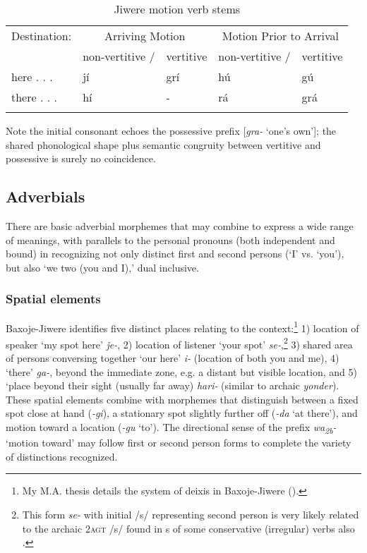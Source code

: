\documentclass[output=paper]{LSP/langsci}
\begin{document}
\begin{table} 
\begin{tabular}{ l l l l l }
\lsptoprule
 Destination: & \multicolumn{2}{c}{Arriving Motion} & \multicolumn{2}{c}{Motion Prior to Arrival} \\
& non-vertitive / & vertitive & non-vertitive / & vertitive \\
\midrule
here . . . 	& jí  & grí & hú &  gú \\
there . . . 	& hí &   -  & rá & grá \\
\lspbottomrule
\end{tabular}
\caption{Jiwere motion verb stems \citep[293]{Taylor1976a}} \label{motionverb}
\end{table}
Note the initial consonant  echoes the possessive prefix [\textit{gra-} `one's own']; the shared phonological shape plus semantic congruity between vertitive and possessive is surely no coincidence.  

\subsection{Adverbials}
There are basic adverbial morphemes that may combine to express a wide range of meanings, with parallels to the personal pronouns (both independent and bound) in recognizing not only distinct first and second persons (`I' vs. `you'), but also `we two (you and I),' dual inclusive.  

\subsubsection{Spatial elements}   

Baxoje-Jiwere identifies five distinct places relating to the  context:\footnote{My M.A. thesis details the system of deixis in Baxoje-Jiwere (\citealt{Hopkins1988}).} 1) location of speaker `my spot here' \textit{\v{j}e-},  2) location of  listener `your spot' \textit{se-},\footnote{This form \textit{se-} with initial /s/ representing second person is very likely related to the archaic \textsc{2agt} /s/ found in s of some conservative (irregular) verbs also \citep[480]{Rankin2005b}.}  3) shared area of persons conversing together `our here' \textit{i-} (location of both you and me),  4) `there' \textit{ga-}, beyond the immediate  zone, e.g. a distant but visible location, and 5) `place beyond their sight (usually far away) \textit{hari-} (similar to archaic  \textit{yonder}).  These spatial elements combine with morphemes that distinguish between a fixed spot close at hand (\textit{-gi}), a stationary spot slightly further off (\textit{-da} `at there'), and motion toward a location (\textit{-gu} `to').  The directional sense of the prefix \textit{wa\textsubscript{2b}-} `motion toward' may follow first or second person forms to complete the variety of distinctions recognized. 
	
\end{document}

